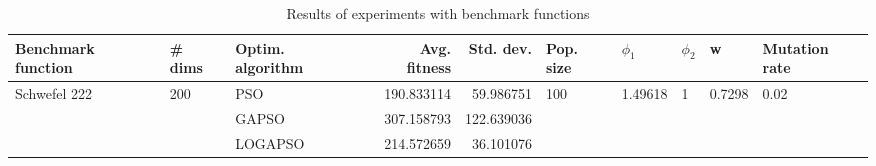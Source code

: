 \begin{table}
\centering
\caption{Results of experiments with benchmark functions}
\begin{tabular}{lllrrlllll}
\toprule
           Benchmark function &              \# dims & Optim. algorithm &  Avg. fitness &  Std. dev. &            Pop. size &               $\phi_{1}$ &         $\phi_{2}$ &                       w &         Mutation rate \\
\midrule
\multirow{3}{*}{Schwefel 222} & \multirow{3}{*}{200} &              PSO &    190.833114 &  59.986751 & \multirow{3}{*}{100} & \multirow{3}{*}{1.49618} & \multirow{3}{*}{1} & \multirow{3}{*}{0.7298} & \multirow{3}{*}{0.02} \\
                              &                      &            GAPSO &    307.158793 & 122.639036 &                      &                          &                    &                         &                       \\
                              &                      &          LOGAPSO &    214.572659 &  36.101076 &                      &                          &                    &                         &                       \\
\bottomrule
\end{tabular}
\end{table}
